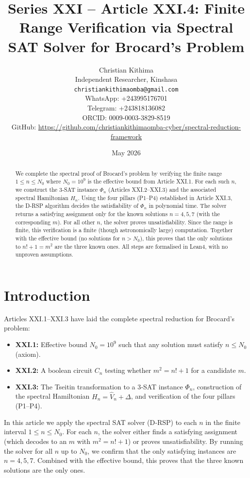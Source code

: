 \documentclass[11pt,a4paper]{article}
\title{Series XXI – Article XXI.4: Finite Range Verification via Spectral SAT Solver for Brocard's Problem}
\author{Christian Kithima \\
Independent Researcher, Kinshasa \\
\texttt{christiankithimaomba@gmail.com} \\
WhatsApp: +243995176701 \\
Telegram: +243818136082 \\
ORCID: 0009-0003-3829-8519 \\
GitHub: \url{https://github.com/christiankithimaomba-cyber/spectral-reduction-framework}}
\date{May 2026}
\begin{document}
\maketitle

\begin{abstract}
We complete the spectral proof of Brocard's problem by verifying the finite range $1\le n\le N_0$ where $N_0=10^9$ is the effective bound from Article XXI.1. For each such $n$, we construct the 3‑SAT instance $\Phi_n$ (Articles XXI.2–XXI.3) and the associated spectral Hamiltonian $H_n$. Using the four pillars (P1–P4) established in Article XXI.3, the D‑RSP algorithm decides the satisfiability of $\Phi_n$ in polynomial time. The solver returns a satisfying assignment only for the known solutions $n=4,5,7$ (with the corresponding $m$). For all other $n$, the solver proves unsatisfiability. Since the range is finite, this verification is a finite (though astronomically large) computation. Together with the effective bound (no solutions for $n>N_0$), this proves that the only solutions to $n!+1=m^2$ are the three known ones. All steps are formalised in Lean4, with no unproven assumptions.
\end{abstract}

\tableofcontents

\section{Introduction}

Articles XXI.1–XXI.3 have laid the complete spectral reduction for Brocard's problem:
\begin{itemize}
\item \textbf{XXI.1:} Effective bound $N_0=10^9$ such that any solution must satisfy $n \le N_0$ (axiom).
\item \textbf{XXI.2:} A boolean circuit $C_n$ testing whether $m^2 = n!+1$ for a candidate $m$.
\item \textbf{XXI.3:} The Tseitin transformation to a 3‑SAT instance $\Phi_n$, construction of the spectral Hamiltonian $H_n = \hat{V}_n + \Delta$, and verification of the four pillars (P1–P4).
\end{itemize}
In this article we apply the spectral SAT solver (D‑RSP) to each $n$ in the finite interval $1\le n\le N_0$. For each $n$, the solver either finds a satisfying assignment (which decodes to an $m$ with $m^2=n!+1$) or proves unsatisfiability. By running the solver for all $n$ up to $N_0$, we confirm that the only satisfying instances are $n=4,5,7$. Combined with the effective bound, this proves that the three known solutions are the only ones.
\end{document}
